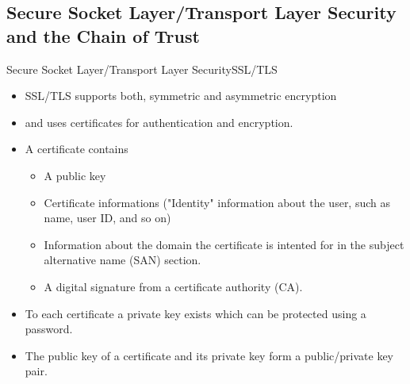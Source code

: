 ﻿\subsection{Secure Socket Layer/Transport Layer Security and the Chain of Trust}

\begin{frame}{\alert{S}ecure \alert{S}ocket \alert{L}ayer/\alert{T}ransport \alert{L}ayer \alert{S}ecurity}{SSL/TLS}
    \begin{itemize}
        \item \alert{SSL/TLS} supports both, \alert{symmetric} and \alert{asymmetric} encryption
        \item and uses \alert{certificates} for \alert{authentication} and \alert{encryption}.
        \item A certificate contains
        \begin{itemize}
            \item A \alert{public key}
            \item Certificate \alert{informations} ("Identity" information about the user, such as name, user ID, and so on)
            \item Information about the \alert{domain} the certificate is \alert{intented for} in the \alert{subject alternative name (SAN)} section.
            \item A \alert{digital signature} from a \alert{certificate authority (CA)}.
        \end{itemize}
        \item To \alert{each} certificate a \alert{private key} exists which can be protected using a password.
        \item The \alert{public key} of a certificate and its \alert{private key} form a public/private key pair.
    \end{itemize}
\end{frame}
